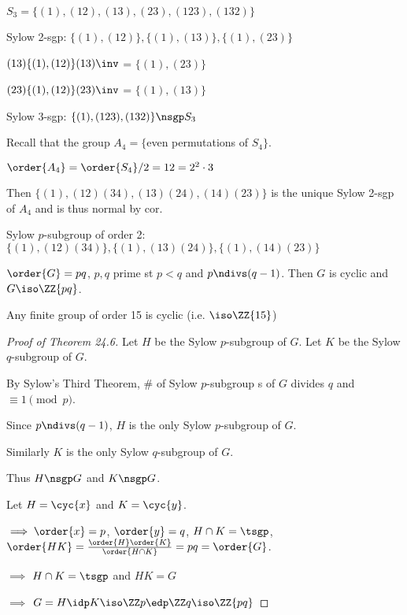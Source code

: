 \begin{example}
  \(S_3 = \{(1), (12), (13), (23), (123), (132)\}\)

  Sylow 2-sgp: \(\{(1), (12)\}, \{(1),(13)\},\{(1),(23)\}\)

  \((13)\{(1),(12)\}(13)\inv\) = \(\{(1),(23)\}\)

  \((23)\{(1),(12)\}(23)\inv\) = \(\{(1),(13)\}\)

  Sylow 3-sgp: \(\{(1),(123),(132)\}\nsgp S_3\)
\end{example}

\begin{example}
  Recall that the group \(A_4 = \{ \)even permutations of \(S_4\}\).

  \(\order{A_4} = \order{S_4}/2=12 = 2^2 \cdot 3\)

  Then \(\{(1), (12)(34), (13)(24), (14)(23)\}\) is the unique Sylow 2-sgp of \(A_4\) and is thus normal by cor.

  Sylow \(p\)-subgroup of order 2: \(\{(1),(12)(34)\},\{(1),(13)(24)\},\{(1),(14)(23)\}\)
\end{example}

\begin{theorem}[24.6]
    \(\order{G}=pq\), \(p,q\) prime st \(p<q\) and \(p\ndivs (q-1)\). Then \(G\) is cyclic and \(G\iso\ZZ{pq}\).
\end{theorem}

\begin{example}
    Any finite group of order 15 is cyclic (i.e. \(\iso\ZZ{15}\))
\end{example}

\begin{proof}[Proof of Theorem 24.6]
    Let \(H\) be the Sylow \(p\)-subgroup of \(G\). Let \(K\) be the Sylow \(q\)-subgroup of \(G\).

    By Sylow's Third Theorem, \# of Sylow \(p\)-subgroup s of \(G\) divides \(q\) and \(\equiv 1\pmod p\).

    Since \(p\ndivs (q-1)\), \(H\) is the only Sylow \(p\)-subgroup of \(G\).

    Similarly \(K\) is the only Sylow \(q\)-subgroup of \(G\).

    Thus \(H\nsgp G\) and \(K\nsgp G\).

    Let \(H=\cyc{x}\) and \(K=\cyc{y}\).

    \(\implies \order{x} = p\), \(\order{y} = q\), \(H\cap K = \tsgp\), \(\order{HK} = \frac{\order{H}\order{K}}{\order{H\cap K}}=pq = \order{G}\).

    \(\implies\) \(H\cap K = \tsgp\) and \(HK=G\)

    \(\implies\) \(G = H\idp K\iso \ZZ p \edp \ZZ q \iso \ZZ{pq}\)
\end{proof}

